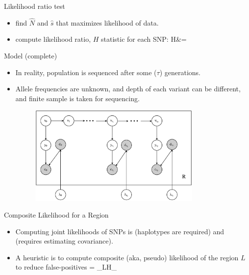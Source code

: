 \documentclass[t]{beamer} %
\begin{document}
\begin{frame}{ Likelihood ratio test}
	\begin{itemize}
		\item find $\hat{N}$ and $\hat{s}$ that  maximizes  likelihood of data.
		\item compute likelihood ratio, $H$ statistic for each SNP:
		\beqq
		H&=
		\eeqq
	\end{itemize}
\end{frame}


\begin{frame}{ Model (complete)}
	\begin{itemize}
		\item  In reality, population is sequenced after some ($\tau$) 
		generations.\\
		\pause
		\item Allele frequencies are unknown, and depth of each variant can be 
		different, and finite sample is taken for sequencing.
		\pause
		\begin{figure}
	\includegraphics[trim={.05in 0in 0.0in 
		0in},clip,width=0.8\textwidth]{../figures/HMMGM}
\end{figure}
	\end{itemize}
\end{frame}

\begin{frame}{Composite Likelihood for a Region }
	\begin{itemize}
		\item Computing joint likelihoods of SNPs is  
		(haplotypes are 
		required) and  (requires estimating covariance).
		\item A heuristic is to compute composite (aka, pseudo) likelihood of  
		the 
		region $L$ to reduce false-positives
		\beqq
		\Hc = \sum_{\ell \in L}H_\ell
		\eeqq
	\end{itemize}
\end{frame}
\end{document}
